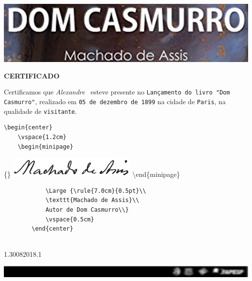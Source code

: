 \documentclass[]{article}
\title{}
\author{}
\date{}
\begin{document}
\thispagestyle{empty} 
\begin{minipage}{\textwidth}
            \includegraphics[width=\textwidth]{imagens/header.jpg}

            \sffamily
            \bigskip
            \bigskip
\end{minipage}

\begin{center}
                {\Huge \textbf{CERTIFICADO}}\\
                \bigskip
                \bigskip
            \end{center}

\begin{center}
                \begin{minipage}{0.8\textwidth}
                    {\Large Certificamos que \emph{Alexandre }\ esteve presente no 
                    \texttt{Lançamento do livro "Dom Casmurro"},  realizado em \texttt{05 de dezembro de 1899} na cidade de 
                    \texttt{Paris}, na qualidade de \texttt{visitante}.}
                \end{minipage}
            \end{center}

\begin{verbatim}
\begin{center}
    \vspace{1.2cm}
    \begin{minipage}
\end{verbatim}

\{\textwidth\} \center
\includegraphics[width=\textwidth]{imagens/assinatura.png}
\textbackslash end\{minipage\}

\begin{verbatim}
            \Large {\rule{7.0cm}{0.5pt}\\
            \texttt{Machado de Assis}\\
            Autor de Dom Casmurro\\}
            \vspace{0.5cm}
        \end{center}    
        
\end{verbatim}

1.30082018.1

\begin{minipage}
{\textwidth}
            \includegraphics[width=\textwidth]{imagens/footer.jpg}

\end{minipage}
\end{document}
